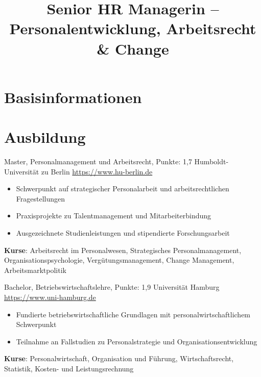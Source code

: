\documentclass[a4paper, serif, 10pt]{moderncv}
\title{Senior HR Managerin – Personalentwicklung, Arbeitsrecht \& Change}
\begin{document}
\maketitle

\section{Basisinformationen}

\section{Ausbildung}

        {Master, Personalmanagement und Arbeitsrecht, Punkte: 1,7}
        {Humboldt-Universität zu Berlin}
        {\url{https://www.hu-berlin.de}}
        {}
        {\begin{itemize}
\item Schwerpunkt auf strategischer Personalarbeit und arbeitsrechtlichen Fragestellungen
\item Praxisprojekte zu Talentmanagement und Mitarbeiterbindung
\item Ausgezeichnete Studienleistungen und stipendierte Forschungsarbeit
\end{itemize}
\textbf{Kurse}: Arbeitsrecht im Personalwesen, Strategisches Personalmanagement, Organisationspsychologie, Vergütungsmanagement, Change Management, Arbeitsmarktpolitik}

        {Bachelor, Betriebswirtschaftslehre, Punkte: 1,9}
        {Universität Hamburg}
        {\url{https://www.uni-hamburg.de}}
        {}
        {\begin{itemize}
\item Fundierte betriebswirtschaftliche Grundlagen mit personalwirtschaftlichem Schwerpunkt
\item Teilnahme an Fallstudien zu Personalstrategie und Organisationsentwicklung
\end{itemize}
\textbf{Kurse}: Personalwirtschaft, Organisation und Führung, Wirtschaftsrecht, Statistik, Kosten- und Leistungsrechnung}
\end{document}
